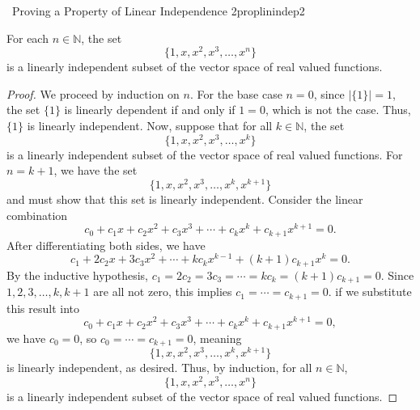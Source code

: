         \begin{example}{\Difficulty\,\Difficulty\,\,Proving a Property of Linear Independence 2}{proplinindep2}
            
            For each \(n\in\mathbb{N}\), the set
            \begin{equation*}
                \{1,x,x^2,x^3,\ldots,x^n\}
            \end{equation*}
            is a linearly independent subset of the vector space of real valued functions.
            \begin{proof}
                We proceed by induction on \(n\). For the base case \(n=0\), since \(|\{1\}|=1\), the set \(\{1\}\) is linearly dependent if and only if \(1=0\), which is not the case. Thus, \(\{1\}\) is linearly independent. Now, suppose that for all \(k\in\mathbb{N}\), the set
                \begin{equation*}
                    \{1,x,x^2,x^3,\ldots,x^k\}
                \end{equation*}
                is a linearly independent subset of the vector space of real valued functions. For \(n=k+1\), we have the set 
                \begin{equation*}
                    \{1,x,x^2,x^3,\ldots,x^k,x^{k+1}\}
                \end{equation*}
                and must show that this set is linearly independent. Consider the linear combination
                \begin{equation*}
                    c_0+c_1x+c_2x^2+c_3x^3+\cdots+c_kx^k+c_{k+1}x^{k+1}=0.
                \end{equation*}
                After differentiating both sides, we have
                \begin{equation*}
                    c_1+2c_2x+3c_3x^2+\cdots +kc_kx^{k-1}+(k+1)c_{k+1}x^k=0.
                \end{equation*}
                By the inductive hypothesis, \(c_1=2c_2=3c_3=\cdots=kc_k=(k+1)c_{k+1}=0\). Since \(1,2,3,\ldots,k,k+1\) are all not zero, this implies \(c_1=\cdots=c_{k+1}=0\). if we substitute this result into
                \begin{equation*}
                    c_0+c_1x+c_2x^2+c_3x^3+\cdots+c_kx^k+c_{k+1}x^{k+1}=0,
                \end{equation*}
                we have \(c_0=0\), so \(c_0=\cdots=c_{k+1}=0\), meaning 
                \begin{equation*}
                   \{1,x,x^2,x^3,\ldots,x^k,x^{k+1}\}
                \end{equation*}
                is linearly independent, as desired. Thus, by induction, for all \(n\in\mathbb{N}\), 
                \begin{equation*}
                    \{1,x,x^2,x^3,\ldots,x^n\}
                \end{equation*}
                is a linearly independent subset of the vector space of real valued functions.
            \end{proof}

        \end{example}

